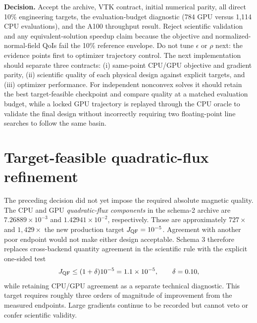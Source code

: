 \documentclass[11pt,a4paper]{article}
\begin{document}
\textbf{Decision.}  Accept the archive, VTK contract, initial numerical parity,
all direct 10\% engineering targets, the evaluation-budget diagnostic (784 GPU
versus 1,114 CPU evaluations), and the A100 throughput result.  Reject
scientific validation and any equivalent-solution speedup claim because the
objective and normalized-normal-field QoIs fail the 10\% reference envelope.
Do not tune $\epsilon$ or $\rho$ next: the evidence points first to optimizer
trajectory control.  The next implementation should separate three contracts:
(i) same-point CPU/GPU objective and gradient parity, (ii) scientific quality of
each physical design against explicit targets, and (iii) optimizer performance.
For independent nonconvex solves it should retain the best target-feasible
checkpoint and compare quality at a matched evaluation budget, while a locked
GPU trajectory is replayed through the CPU oracle to validate the final design
without incorrectly requiring two floating-point line searches to follow the
same basin.

\section{Target-feasible quadratic-flux refinement}

The preceding decision did not yet impose the required absolute magnetic
quality.  The CPU and GPU \emph{quadratic-flux components} in the schema-2
archive are $7.26889\times10^{-3}$ and $1.42941\times10^{-2}$, respectively.
Those are approximately $727\times$ and $1{,}429\times$ the new production
target $J_{\rm QF}=10^{-5}$.  Agreement with another poor endpoint would not
make either design acceptable.  Schema 3 therefore replaces cross-backend
quantity agreement in the scientific rule with the explicit one-sided test
\[
 J_{\rm QF}\leq (1+\delta)10^{-5}=1.1\times10^{-5},\qquad \delta=0.10,
\]
while retaining CPU/GPU agreement as a separate technical diagnostic.  This
target requires roughly three orders of magnitude of improvement from the
measured endpoints.  Large gradients continue to be recorded but cannot veto
or confer scientific validity.
\end{document}
